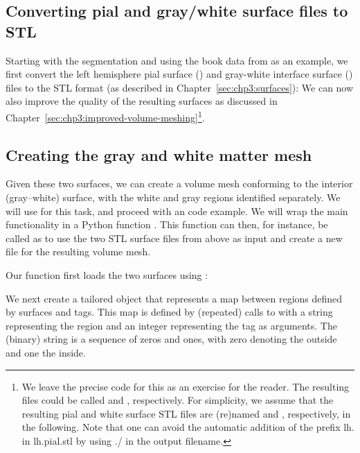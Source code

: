 \subsection{Converting pial and gray/white surface files to STL}
Starting with the \freesurfer{} segmentation and using the book data
from  as an example, we first convert the
left hemisphere pial surface () and gray-white interface
surface () files to the STL format (as described in
Chapter~\ref{sec:chp3:surfaces}):
\noindent We can now also improve the quality of the resulting
surfaces as discussed in
Chapter~\ref{sec:chp3:improved-volume-meshing}\footnote{We leave the
  precise code for this as an exercise for the reader. The resulting
  files could be called  and
  , respectively. For simplicity, we assume that the
  resulting pial and white surface STL files are (re)named
   and , respectively, in the following.  Note
  that one can avoid the automatic addition of the prefix lh. in
  lh.pial.stl by using ./ in the output filename.}.

\subsection{Creating the gray and white matter mesh}
Given these two surfaces, we can create a volume mesh conforming to
the interior (gray--white) surface, with the white and gray regions
identified separately. We will use \svmtk{} for this task, and
proceed with an \svmtk{} code example. We will wrap the main
functionality in a Python function
. This function can then, for instance,
be called as
to use the two STL surface files from above as input and create a new
file  for the resulting volume mesh.

Our function first loads the two surfaces using \svmtk{}:

\noindent We next create a tailored \svmtk{}
 object that represents a map between
regions defined by surfaces and tags. This map is defined by
(repeated) calls to  with a string representing the
region and an integer representing the tag as arguments. The (binary)
string is a sequence of zeros and ones, with zero denoting the outside
and one the inside.

